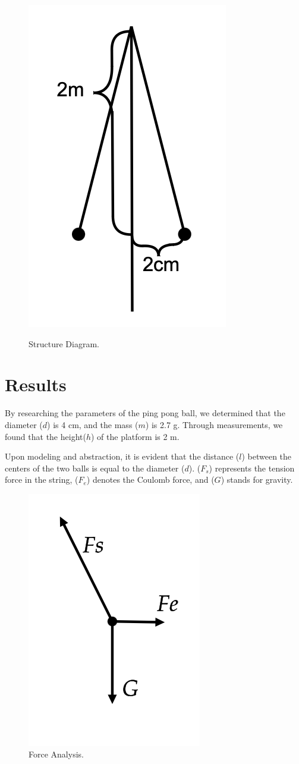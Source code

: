 \documentclass[12pt]{article}
\begin{document}
\begin{figure}[htb]
{		\includegraphics[scale=0.87]{3.png}}
\caption{Structure Diagram.}
\end{figure}

\section{Results}
By researching the parameters of the ping pong ball, we determined that the diameter ($d$) is 4 cm, and the mass ($m$) is 2.7 g. Through measurements, we found that the height($h$) of the platform is 2 m.

Upon modeling and abstraction, it is evident that the distance ($l$) between the centers of the two balls is equal to the diameter ($d$). ($F_s$) represents the tension force in the string, ($F_e$) denotes the Coulomb force, and ($G$) stands for gravity.

\begin{figure}[h]
    \centering
    \includegraphics[width=0.3\linewidth]{4.png}
    \caption{Force Analysis.}
\end{figure}
\end{document}
